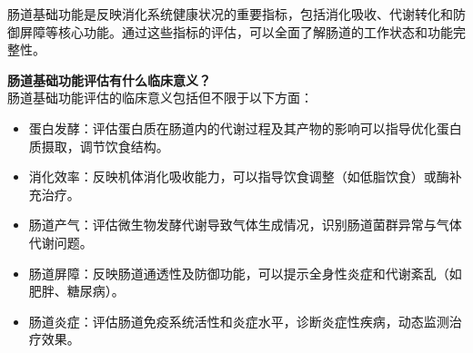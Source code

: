 \documentclass[UTF8]{ctexart}
\begin{document}
\vspace{-1.0cm}

\begin{tcolorbox}[
    enhanced,
    colback=customTealBg,
    colframe=gray!3,
    arc=3mm,
    boxrule=0pt,
    width=\textwidth,
    top=8pt,
    bottom=8pt
]
{\small{\color{customTeal}\faInfoCircle} 肠道基础功能是反映消化系统健康状况的重要指标，包括消化吸收、代谢转化和防御屏障等核心功能。通过这些指标的评估，可以全面了解肠道的工作状态和功能完整性。
}
\end{tcolorbox}

\begin{tcolorbox}[
    enhanced,
    colback=lightpurple!10, %
    colframe=white,  %
    arc=3mm,
    boxrule=0.5pt,
    width=\textwidth,
    top=8pt,
    bottom=8pt
]
{\small{\color{lightpurple}\faQuestionCircle}\quad \textbf{肠道基础功能评估有什么临床意义？}\\
{\color{orange!50}\faComments}\quad 肠道基础功能评估的临床意义包括但不限于以下方面：
\begin{itemize}
    \item 蛋白发酵：评估蛋白质在肠道内的代谢过程及其产物的影响可以指导优化蛋白质摄取，调节饮食结构。
    \item 消化效率：反映机体消化吸收能力，可以指导饮食调整（如低脂饮食）或酶补充治疗。
    \item 肠道产气：评估微生物发酵代谢导致气体生成情况，识别肠道菌群异常与气体代谢问题。
    \item 肠道屏障：反映肠道通透性及防御功能，可以提示全身性炎症和代谢紊乱（如肥胖、糖尿病）。
    \item 肠道炎症：评估肠道免疫系统活性和炎症水平，诊断炎症性疾病，动态监测治疗效果。
\end{itemize}
}
\end{tcolorbox}
\vspace{-0.7cm}
\end{document}
